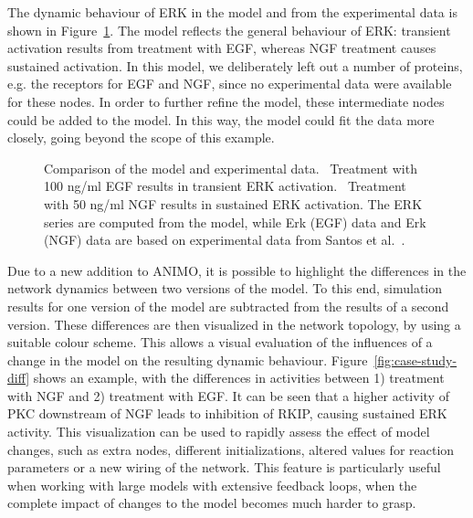\documentclass[journal, 10pt]{IEEEtran}
\begin{document}
The dynamic behaviour of ERK in the model and from the experimental data is shown in Figure~\ref{fig:case-study-graphs}. 
The model reflects the general behaviour of ERK: transient activation results from treatment with EGF,
whereas NGF treatment causes sustained activation. In this model, we deliberately left out a number of proteins,
e.g. the receptors for EGF and NGF, since no experimental data were available for these nodes. In order to further refine the model, 
these intermediate nodes could be added to the model. In this way, the model could fit the data more closely, 
going beyond the scope of this example.


\begin{figure}[htb]
\centering
{}%
\caption{Comparison of the model and experimental data.
{\bf \protect{}}~Treatment with 100 ng/ml EGF results in transient ERK activation.
{\bf \protect{}}~Treatment with 50 ng/ml NGF results in sustained ERK activation.
The {\sf ERK} series are computed from the model, while {\sf Erk (EGF) data} and {\sf Erk (NGF) data}
are based on experimental data from Santos et al.~\cite{egf-ngf}.}
\label{fig:case-study-graphs}
\end{figure}


Due to a new addition to ANIMO, it is possible to highlight the differences in the network dynamics 
between two versions of the model. To this end, simulation results for one version of the model are subtracted from the results
of a second version. These differences are then visualized in the network topology, by using a suitable colour scheme. This allows a visual
evaluation of the influences of a change in the model on the resulting dynamic behaviour. Figure~\ref{fig:case-study-diff}
shows an example, with the differences in activities between 1) treatment with NGF and 2) treatment with EGF. It can be seen that 
a higher activity of PKC downstream of NGF leads to inhibition of RKIP, causing sustained ERK activity. 
This visualization can be used to rapidly assess the effect of model changes, such as extra nodes, 
different initializations, altered values for reaction parameters or a new wiring of the network. 
This feature is particularly useful when working with large models with extensive feedback loops, 
when the complete impact of changes to the model becomes much harder to grasp.
\end{document}
